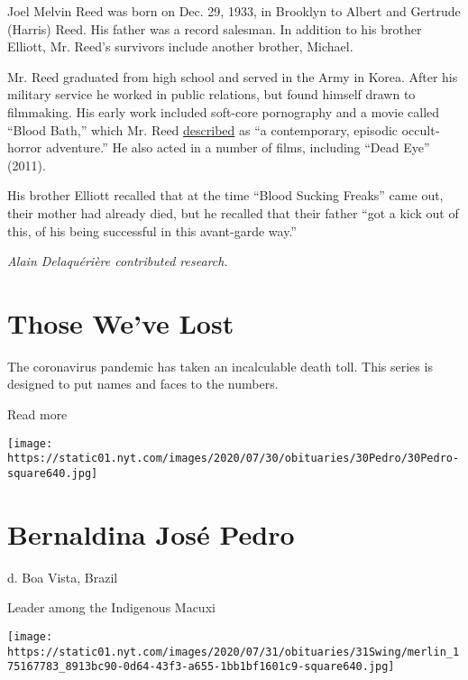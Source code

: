 Joel Melvin Reed was born on Dec. 29, 1933, in Brooklyn to Albert and
Gertrude (Harris) Reed. His father was a record salesman. In addition to
his brother Elliott, Mr. Reed's survivors include another brother,
Michael.

Mr. Reed graduated from high school and served in the Army in Korea.
After his military service he worked in public relations, but found
himself drawn to filmmaking. His early work included soft-core
pornography and a movie called ``Blood Bath,'' which Mr. Reed
\href{https://www.nytimes.com/1974/04/28/archives/news-of-the-screen-greece-is-subject-of-a-new-dassin-shooting.html}{described}
as ``a contemporary, episodic occult‐horror adventure.'' He also acted
in a number of films, including ``Dead Eye'' (2011).

His brother Elliott recalled that at the time ``Blood Sucking Freaks''
came out, their mother had already died, but he recalled that their
father ``got a kick out of this, of his being successful in this
avant-garde way.''

\emph{Alain Delaquérière contributed research.}

\href{https://www.nytimes.com/interactive/2020/obituaries/people-died-coronavirus-obituaries.html?action=click\&pgtype=Article\&state=default\&region=BELOW_MAIN_CONTENT\&context=covid_obits_promo}{}

\hypertarget{those-weve-lost}{%
\section{Those We've Lost}\label{those-weve-lost}}

The coronavirus pandemic has taken an incalculable death toll. This
series is designed to put names and faces to the numbers.

Read more

\texttt{[image: https://static01.nyt.com/images/2020/07/30/obituaries/30Pedro/30Pedro-square640.jpg]}

\hypertarget{bernaldina-josuxe9-pedro}{%
\section{Bernaldina José Pedro}\label{bernaldina-josuxe9-pedro}}

d. Boa Vista, Brazil

Leader among the Indigenous Macuxi

\texttt{[image: https://static01.nyt.com/images/2020/07/31/obituaries/31Swing/merlin\_175167783\_8913bc90-0d64-43f3-a655-1bb1bf1601c9-square640.jpg]}

